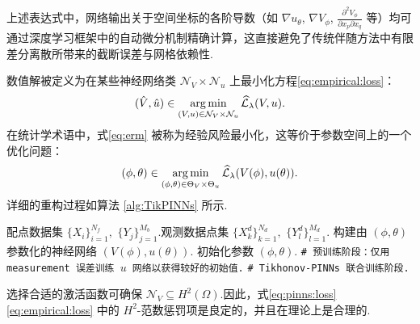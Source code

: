 上述表达式中，网络输出关于空间坐标的各阶导数（如 $\nabla u_{\theta}$, $\nabla V_{\phi}$, $\frac{\partial^2 V_{\phi}}{\partial x_p \partial x_q}$ 等）均可通过深度学习框架中的自动微分机制精确计算，这直接避免了传统伴随方法中有限差分离散所带来的截断误差与网格依赖性.

数值解被定义为在某些神经网络类 $\mathcal{N}_V\times\mathcal{N}_u$ 上最小化方程\eqref{eq:empirical:loss}：
\begin{equation}\label{eq:erm}
(\hat{V},\hat{u})\in\operatorname*{arg\,min}_{(V,u)\in\mathcal{N}_V\times\mathcal{N}_u}\widehat{\mathcal{L}}_{\lambda}(V,u).
\end{equation}
在统计学术语中，式\eqref{eq:erm} 被称为经验风险最小化，这等价于参数空间上的一个优化问题：
\begin{equation*}
(\phi,\theta)\in\operatorname*{arg\,min}_{(\phi,\theta)\in\Theta_{V}\times\Theta_{u}}\widehat{\mathcal{L}}_{\lambda}(V(\phi),u(\theta)).
\end{equation*}
详细的重构过程如算法 \ref{alg:TikPINNs} 所示.
\par\noindent
\begin{minipage}{\textwidth}
\renewcommand*\footnoterule{}
\renewcommand{\thempfootnote}{\fnsymbol{mpfootnote}}
\begin{algorithm}[H]
\caption{Tikhonov-PINNs}
\label{alg:TikPINNs}
\begin{algorithmic}[1]
\Require 配点数据集 $\{X_{i}\}_{i=1}^{N_f},$ $\{Y_{j}\}_{j=1}^{M_b}$.观测数据点集 $\{X_{k}^{d}\}_{k=1}^{N_d},$ $\{Y_{l}^{d}\}_{l=1}^{M_d}$.
\State 构建由 $(\phi,\theta)$ 参数化的神经网络 $(V(\phi),u(\theta))$.
\State 初始化参数 $(\phi,\theta)$.
\State \textcolor{white!30!black}{\texttt{\# 预训练阶段：仅用 measurement 误差训练 $u$ 网络以获得较好的初始值.}}
\EndFor
\State \textcolor{white!30!black}{\texttt{\# Tikhonov-PINNs 联合训练阶段.}}
\EndFor
{}
\end{algorithmic}
\end{algorithm}
\end{minipage}
\begin{remark}
选择合适的激活函数可确保 $\mathcal{N}_V\subseteq H^{2}(\Omega)$.因此，式\eqref{eq:pinns:loss}\eqref{eq:empirical:loss} 中的 $H^{2}$-范数惩罚项是良定的，并且在理论上是合理的.
\end{remark}


